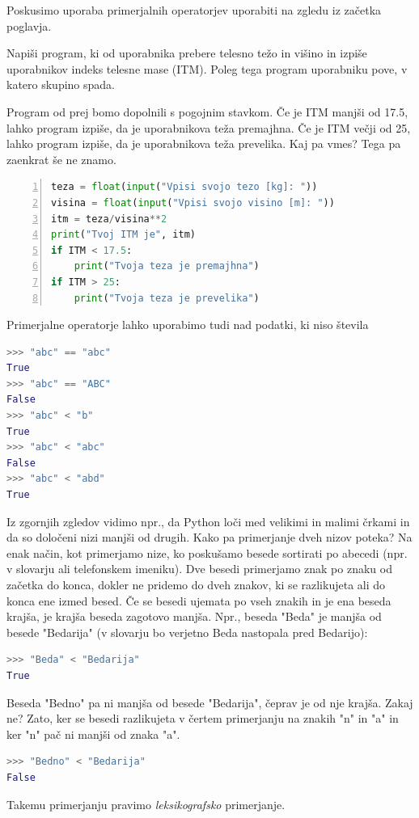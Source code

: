 Poskusimo uporaba primerjalnih operatorjev uporabiti na zgledu iz začetka poglavja.
\begin{zgled}
Napiši program, ki od uporabnika prebere telesno težo in višino in izpiše uporabnikov indeks telesne mase (ITM). Poleg tega program uporabniku pove, v katero skupino spada. 
\end{zgled}
\begin{resitev}
Program od prej bomo dopolnili s pogojnim stavkom. Če je ITM manjši od 17.5, lahko program izpiše, da je uporabnikova teža premajhna. Če je ITM večji od 25, lahko program izpiše, da je uporabnikova teža prevelika. Kaj pa vmes? Tega pa zaenkrat še ne znamo. 
\begin{lstlisting}[language=Python,numbers=left]
teza = float(input("Vpisi svojo tezo [kg]: "))
visina = float(input("Vpisi svojo visino [m]: "))
itm = teza/visina**2
print("Tvoj ITM je", itm)
if ITM < 17.5:
    print("Tvoja teza je premajhna")
if ITM > 25:
    print("Tvoja teza je prevelika")
\end{lstlisting}
\end{resitev}

Primerjalne operatorje lahko uporabimo tudi nad podatki, ki niso števila
\begin{lstlisting}[language=Python]
>>> "abc" == "abc"
True
>>> "abc" == "ABC"
False
>>> "abc" < "b"
True
>>> "abc" < "abc"
False
>>> "abc" < "abd"
True
\end{lstlisting}
Iz zgornjih zgledov vidimo npr., da Python loči med velikimi in malimi črkami in da so določeni nizi manjši od drugih. Kako pa primerjanje dveh nizov poteka? Na enak način, kot primerjamo nize, ko poskušamo besede sortirati po abecedi (npr. v slovarju ali telefonskem imeniku). Dve besedi primerjamo znak po znaku od začetka do konca, dokler ne pridemo do dveh znakov, ki se razlikujeta ali do konca ene izmed besed. Če se besedi ujemata po vseh znakih in je ena beseda krajša, je krajša beseda zagotovo manjša. Npr., beseda "Beda" je manjša od besede "Bedarija" (v slovarju bo verjetno Beda nastopala pred Bedarijo):
\begin{lstlisting}[language=Python]
>>> "Beda" < "Bedarija"
True
\end{lstlisting}
Beseda "Bedno" pa ni manjša od besede "Bedarija", čeprav je od nje krajša. Zakaj ne? Zato, ker se besedi razlikujeta v čertem primerjanju na znakih "n" in "a" in ker "n" pač ni manjši od znaka "a".
\begin{lstlisting}[language=Python]
>>> "Bedno" < "Bedarija"
False
\end{lstlisting}
Takemu primerjanju pravimo \emph{leksikografsko} primerjanje. 

